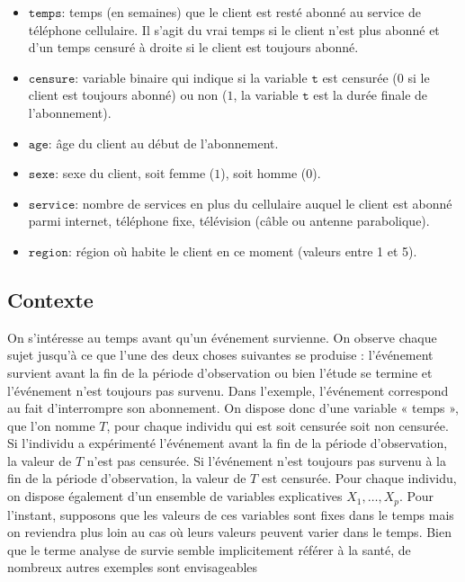 \documentclass[
  11pt,
  letterpaper,
]{book}
\providecommand{\tightlist}{%
  \setlength{\itemsep}{0pt}\setlength{\parskip}{0pt}}\usepackage{longtable,booktabs,array}
\theoremstyle{definition}
\theoremstyle{remark}
\begin{document}
\begin{itemize}
\tightlist
\item
  \(\texttt{temps}\): temps (en semaines) que le client est resté abonné
  au service de téléphone cellulaire. Il s'agit du vrai temps si le
  client n'est plus abonné et d'un temps censuré à droite si le client
  est toujours abonné.
\item
  \(\texttt{censure}\): variable binaire qui indique si la variable
  \(\texttt{t}\) est censurée (\(0\) si le client est toujours abonné)
  ou non (\(1\), la variable \(\texttt{t}\) est la durée finale de
  l'abonnement).
\item
  \(\texttt{age}\): âge du client au début de l'abonnement.
\item
  \(\texttt{sexe}\): sexe du client, soit femme (\(1\)), soit homme
  (\(0\)).
\item
  \(\texttt{service}\): nombre de services en plus du cellulaire auquel
  le client est abonné parmi internet, téléphone fixe, télévision (câble
  ou antenne parabolique).
\item
  \(\texttt{region}\): région où habite le client en ce moment (valeurs
  entre 1 et 5).
\end{itemize}

\hypertarget{contexte}{%
\subsection{Contexte}\label{contexte}}

On s'intéresse au temps avant qu'un événement survienne. On observe
chaque sujet jusqu'à ce que l'une des deux choses suivantes se produise
: l'événement survient avant la fin de la période d'observation ou bien
l'étude se termine et l'événement n'est toujours pas survenu. Dans
l'exemple, l'événement correspond au fait d'interrompre son abonnement.
On dispose donc d'une variable « temps », que l'on nomme \(T\), pour
chaque individu qui est soit censurée soit non censurée. Si l'individu a
expérimenté l'événement avant la fin de la période d'observation, la
valeur de \(T\) n'est pas censurée. Si l'événement n'est toujours pas
survenu à la fin de la période d'observation, la valeur de \(T\) est
censurée. Pour chaque individu, on dispose également d'un ensemble de
variables explicatives \(X_1, \ldots, X_p\). Pour l'instant, supposons
que les valeurs de ces variables sont fixes dans le temps mais on
reviendra plus loin au cas où leurs valeurs peuvent varier dans le
temps. Bien que le terme analyse de survie semble implicitement référer
à la santé, de nombreux autres exemples sont envisageables
\end{document}
